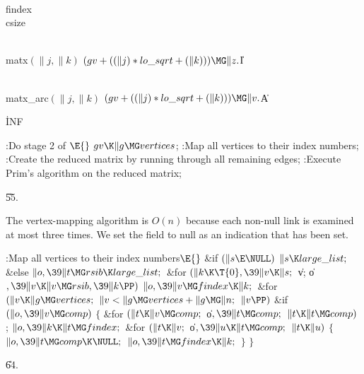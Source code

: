 \Y\B\4\D\\{findex}\5
\\{csize}\par
\B\4\D\\{matx}$(\|j,\|k)$\5
$(\\{gv}+((\|j)*\\{lo\_sqrt}+(\|k)))\MG\|z.{}$\|I\par
\B\4\D\\{matx\_arc}$(\|j,\|k)$\5
$(\\{gv}+((\|j)*\\{lo\_sqrt}+(\|k)))\MG\|v.{}$\|A\par
\B\4\D\.{INF}\5
\par
\Y\B\4:Do stage 2 of \X${}\E{}$\6
$\\{gv}\K\|g\MG\\{vertices}{}$;\6
:Map all vertices to their index numbers\X;\6
:Create the reduced matrix by running through all remaining edges\X;\6
:Execute Prim's algorithm on the reduced matrix\X;\par
\U55.\fi

The vertex-mapping algorithm is $O(n)$ because each non-null  link
is examined at most three times. We set the  field to null
as an indication that  has been set.

\Y\B\4:Map all vertices to their index numbers\X${}\E{}$\6
\&{if} ${}(\|s\E\NULL){}$\1\5
${}\|s\K\\{large\_list};{}$\2\6
\&{else}\1\5
${}\|o,\39\|t\MG\\{rsib}\K\\{large\_list};{}$\2\6
\&{for} ${}(\|k\K\T{0},\39\|v\K\|s;{}$ \|v; \|o${},\39\|v\K\|v\MG\\{rsib},\39%
\|k\PP){}$\1\5
${}\|o,\39\|v\MG\\{findex}\K\|k;{}$\2\6
\&{for} ${}(\|v\K\|g\MG\\{vertices};{}$ ${}\|v<\|g\MG\\{vertices}+\|g\MG\|n;{}$
${}\|v\PP){}$\1\6
\&{if} ${}(\|o,\39\|v\MG\\{comp}){}$\5
${}\{{}$\1\6
\&{for} ${}(\|t\K\|v\MG\\{comp};{}$ \|o${},\39\|t\MG\\{comp};{}$ ${}\|t\K\|t\MG%
\\{comp}){}$\1\5
;\2\6
${}\|o,\39\|k\K\|t\MG\\{findex};{}$\6
\&{for} ${}(\|t\K\|v;{}$ \|o${},\39\|u\K\|t\MG\\{comp};{}$ ${}\|t\K\|u){}$\5
${}\{{}$\1\6
${}\|o,\39\|t\MG\\{comp}\K\NULL;{}$\6
${}\|o,\39\|t\MG\\{findex}\K\|k;{}$\6
\4${}\}{}$\2\6
\4${}\}{}$\2\2\par
\U64.\fi

